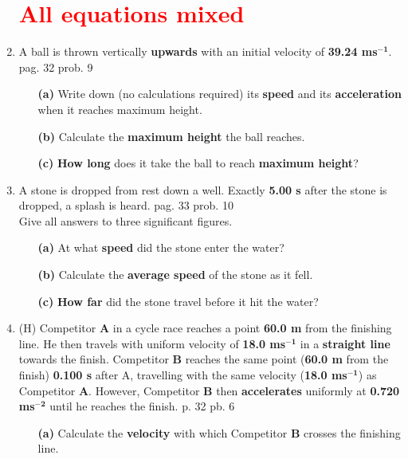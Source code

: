 \documentclass[A4,12pt]{article}
\begin{document}
\begin{enumerate}[label=\bfseries (\arabic*)]
\section*{\textcolor{red}{All equations mixed}}
%
%
%
%
%
%
%
%
%
%
%
%
%
%
%
%
%
%
%
%
%
%
\item A ball is thrown vertically {\bf upwards} with an initial velocity of {\bf 39.24 ms}$\bm{^{-1}}$. \cite{ASCCEA} pag. 32 prob. 9
\begin{itemize}
    \item[\bf (a)] Write down (no calculations required) its {\bf speed} and its {\bf acceleration} when it reaches maximum height. 
    \item[\bf (b)] Calculate the {\bf maximum height} the ball reaches.
    \item[\bf (c)] {\bf How long} does it take the ball to reach {\bf maximum height}?
\end{itemize}
%
%
%
%
%
%
%
%
%
%
%
%
%
\item A stone is dropped from rest down a well. Exactly {\bf 5.00 s} after the stone is dropped, a splash
is heard. \cite{ASCCEA} pag. 33 prob. 10\\
Give all answers to three significant figures. 
\begin{itemize}
    \item[\bf (a)] At what {\bf speed} did the stone enter the water? 
    \item[\bf (b)] Calculate the {\bf average speed} of the stone as it fell.
    \item[\bf (c)] {\bf How far} did the stone travel before it hit the water?
\end{itemize}
%
%
%
%
%
%
%
%
%
%
%
%
%
%
%
%
%
%
%
%
%
\item (H) Competitor {\bf A} in a cycle race reaches a point {\bf 60.0 m} from the finishing line. He then travels with uniform velocity of {\bf 18.0 ms}$\bm{^{-1}}$ in a {\bf straight line} towards the finish. Competitor {\bf B} reaches the same point ({\bf 60.0 m} from the finish) {\bf 0.100 s} after A, travelling with the same velocity ({\bf 18.0 ms}$\bm{^{-1}}$) as Competitor {\bf A}. However, Competitor {\bf B} then {\bf accelerates} uniformly at {\bf 0.720 ms}$\bm{^{-2}}$ until he reaches the finish. \cite{ASCCEA} p. 32 pb. 6
%
\begin{itemize}
    \item[\bf (a)] Calculate the {\bf velocity} with which Competitor {\bf B} crosses the finishing line.

\end{itemize}
\end{enumerate}
\end{document}
